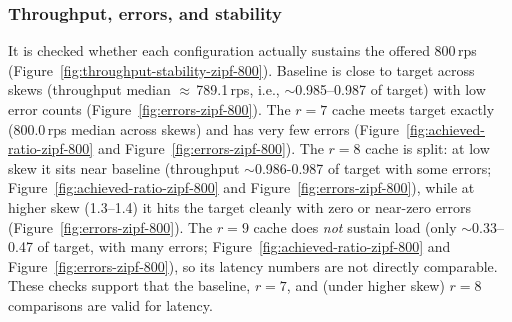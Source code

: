 \subsubsection{Throughput, errors, and stability}
It is checked whether each configuration actually sustains the offered 800\,\ac{rps} (Figure~\ref{fig:throughput-stability-zipf-800}). Baseline is close to target across skews (throughput median $\approx$\,789.1\,\ac{rps}, i.e., $\sim$0.985–0.987 of target) with low error counts (Figure~\ref{fig:errors-zipf-800}). The $r{=}7$ cache meets target exactly (800.0\,\ac{rps} median across skews) and has very few errors (Figure~\ref{fig:achieved-ratio-zipf-800} and Figure~\ref{fig:errors-zipf-800}). The $r{=}8$ cache is split: at low skew it sits near baseline (throughput $\sim$0.986-0.987 of target with some errors; Figure~\ref{fig:achieved-ratio-zipf-800} and Figure~\ref{fig:errors-zipf-800}), while at higher skew (1.3–1.4) it hits the target cleanly with zero or near-zero errors (Figure~\ref{fig:errors-zipf-800}). The $r{=}9$ cache does \emph{not} sustain load (only $\sim$0.33–0.47 of target, with many errors; Figure~\ref{fig:achieved-ratio-zipf-800} and Figure~\ref{fig:errors-zipf-800}), so its latency numbers are not directly comparable. These checks support that the baseline, $r{=}7$, and (under higher skew) $r{=}8$ comparisons are valid for latency.

